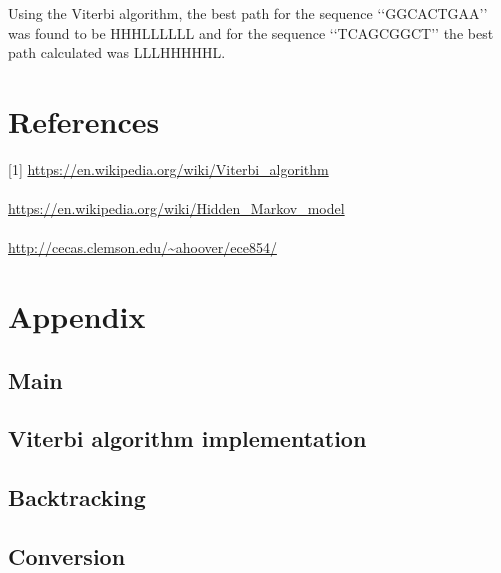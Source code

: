 \documentclass[12pt]{article}
\begin{document}
Using the Viterbi algorithm, the best path for the sequence \lq\lq{GGCACTGAA}\rq\rq{} was found to be HHHLLLLLL and for the sequence \lq\lq{TCAGCGGCT}\rq\rq{} the best path calculated was LLLHHHHHL.

\section*{References}
[1] \url {https://en.wikipedia.org/wiki/Viterbi_algorithm} \\
\\ \noindent
[2] \url {https://en.wikipedia.org/wiki/Hidden_Markov_model} \\
\\ \noindent
[3] \url {http://cecas.clemson.edu/~ahoover/ece854/} \\

\newpage
\section*{Appendix}

\subsection*{Main}

\subsection*{Viterbi algorithm implementation}

\subsection*{Backtracking}

\subsection*{Conversion}


\end{document}
